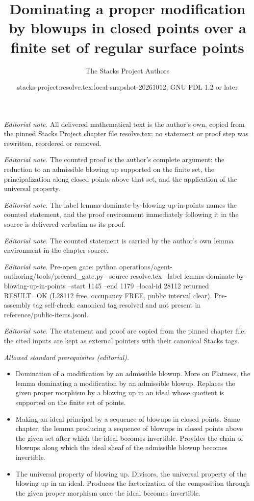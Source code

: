 \documentclass[10pt,a4paper]{amsart}
\title{Dominating a proper modification by blowups in closed points over a finite set of regular surface points}
\author{The Stacks Project Authors}
\date{stacks-project:resolve.tex:local-snapshot-20261012; GNU FDL 1.2 or later}
\theoremstyle{plain}
\theoremstyle{definition}
\theoremstyle{remark}
\numberwithin{equation}{subsection}
\begin{document}
\maketitle
\noindent\textit{Editorial note.} All delivered mathematical text is the author's own, copied from the pinned Stacks Project chapter file resolve.tex; no statement or proof step was rewritten, reordered or removed.\par\medskip
\noindent\textit{Editorial note.} The counted proof is the author's complete argument: the reduction to an admissible blowing up supported on the finite set, the principalization along closed points above that set, and the application of the universal property.\par\medskip
\noindent\textit{Editorial note.} The label lemma-dominate-by-blowing-up-in-points names the counted statement, and the proof environment immediately following it in the source is delivered verbatim as its proof.\par\medskip
\noindent\textit{Editorial note.} The counted statement is carried by the author's own lemma environment in the chapter source.\par\medskip
\noindent\textit{Editorial note.} Pre-open gate: python operations/agent-authoring/tools/precard\_gate.py --source resolve.tex --label lemma-dominate-by-blowing-up-in-points --start 1145 --end 1179 --local-id 28112 returned RESULT=OK (L28112 free, occupancy FREE, public interval clear). Pre-assembly tag self-check: canonical tag resolved and not present in reference/public-items.jsonl.\par\medskip
\noindent\textit{Editorial note.} The statement and proof are copied from the pinned chapter file; the cited inputs are kept as external pointers with their canonical Stacks tags.\par\medskip
\noindent\textit{Allowed standard prerequisites (editorial).}\begin{itemize}
\item Domination of a modification by an admissible blowup. More on Flatness, the lemma dominating a modification by an admissible blowup. Replaces the given proper morphism by a blowing up in an ideal whose quotient is supported on the finite set of points.
\item Making an ideal principal by a sequence of blowups in closed points. Same chapter, the lemma producing a sequence of blowups in closed points above the given set after which the ideal becomes invertible. Provides the chain of blowups along which the ideal sheaf of the admissible blowup becomes invertible.
\item The universal property of blowing up. Divisors, the universal property of the blowing up in an ideal. Produces the factorization of the composition through the given proper morphism once the ideal becomes invertible.
\end{itemize}\medskip
\end{document}

